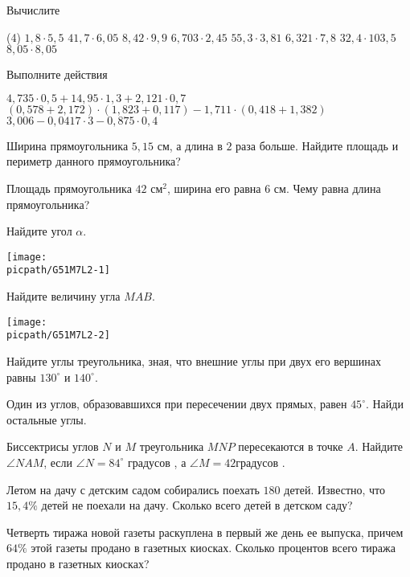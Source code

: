 \begin{class}[number=2]
	\begin{listofex}
		\item Вычислите 
		\begin{tasks}(4)
			\task \( 1,8\cdot5,5 \)
			\task \( 41,7\cdot6,05 \)
			\task \( 8,42\cdot9,9 \)
			\task \( 6,703\cdot2,45 \)
			\task \( 55,3\cdot3,81 \)
			\task \( 6,321\cdot7,8 \)
			\task \( 32,4\cdot103,5 \)
			\task \( 8,05\cdot8,05 \)
		\end{tasks}
	\item Выполните действия
	\begin{tasks}
		\task \( 4,735\cdot0,5+14,95\cdot1,3+2,121\cdot0,7 \)
		\task \( (0,578+2,172)\cdot(1,823+0,117)-1,711\cdot(0,418+1,382) \)
		\task \( 3,006-0,0417\cdot3-0,875\cdot0,4 \)
	\end{tasks}
	\item Ширина прямоугольника \( 5,15 \) см, а длина в \( 2 \) раза больше. Найдите площадь и периметр данного прямоугольника?
	\item Площадь прямоугольника \( 42 \) см\( ^{2} \), ширина его равна \( 6 \) см. Чему равна длина прямоугольника?
	\item 
	\begin{minipage}[t]{\bodywidth}
		Найдите угол \( \alpha \).
	\end{minipage}
	\hspace{0.02\linewidth}
	\begin{minipage}[t]{\picwidth}
		\texttt{[image: \\picpath/G51M7L2-1]}
	\end{minipage}
	\item 
	\begin{minipage}[t]{\bodywidth}
		Найдите величину угла \( MAB \).
	\end{minipage}
	\hspace{0.02\linewidth}
	\begin{minipage}[t]{\picwidth}
		\texttt{[image: \\picpath/G51M7L2-2]}
	\end{minipage}
	\item Найдите углы треугольника, зная, что внешние углы при двух его вершинах равны \( 130^{\circ} \) и \( 140^{\circ} \).
	\item Один из углов, образовавшихся при пересечении двух прямых, равен \( 45^{\circ} \). Найди остальные углы.
	\item Биссектрисы углов \( N \) и \( M \) треугольника \(  MNP \) пересекаются в точке \( A \). Найдите \( \angle NAM \), если \( \angle N=84^{\circ} \) градусов , а \( \angle M=42 \)градусов . 
	\item Летом на дачу с детским садом собирались поехать \( 180 \) детей. Известно, что \( 15,4\% \) детей не поехали на дачу. Сколько всего детей в детском саду?
	\item Четверть тиража новой газеты раскуплена в первый же день ее выпуска, причем \( 64\% \) этой газеты продано в газетных киосках. Сколько процентов всего тиража продано в газетных киосках?
	\end{listofex}
\end{class}

